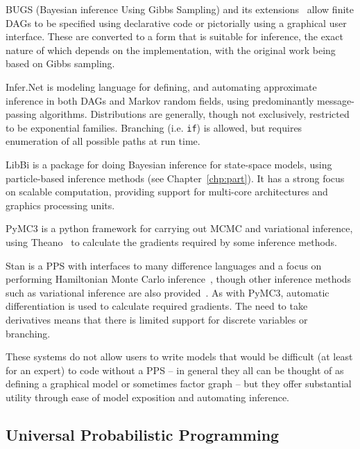 BUGS (Bayesian inference Using Gibbs Sampling) \citep{spiegelhalter1996bugs} and its 
	extensions~\citep{lunn2000winbugs,plummer2003jags,todeschini2014biips}
	allow finite DAGs to be specified using declarative code or pictorially using a graphical user
	interface.  These are converted to a form that is suitable for inference, the exact nature of which
	depends on the implementation, with the original work being based on Gibbs sampling.
	
Infer.Net \citep{minka_software_2010} is modeling language for defining, and automating approximate inference in
	both DAGs and Markov random fields, using predominantly message-passing algorithms. Distributions
	are generally, though not exclusively, restricted to be exponential families.  Branching (i.e. \texttt{if}) 
	is allowed, but requires enumeration of all possible paths at run time.

LibBi \citep{murray2013bayesian} is a package for doing Bayesian inference for state-space models,
	using particle-based inference methods (see Chapter~\ref{chp:part}).  It has a strong focus on scalable
	computation, providing support for multi-core architectures and graphics processing units.

PyMC3 \citep{salvatier2016probabilistic} is a python framework for carrying out MCMC and variational
	inference, using Theano~\citep{bergstra2010theano} to calculate the gradients required by some inference methods.

Stan \citep{carpenter2015stan} is a PPS with interfaces to many difference languages and a
	focus on performing Hamiltonian Monte Carlo inference~\citep{duane1987hybrid,hoffman2014no}, though
	other inference methods such as variational inference are also provided~\citep{kucukelbir2015automatic}.
	As with PyMC3, automatic differentiation is used to calculate required gradients.  The need to take
	derivatives means that there is limited support for discrete variables or branching.

These systems do not allow users to write models that would be difficult (at least for
an expert) to code without a PPS -- in general they all can be thought of as defining a graphical model
or sometimes factor graph -- but they offer substantial utility through ease of model exposition and
automating inference.

\subsection{Universal Probabilistic Programming}
\label{sec:probprog:two:general}


